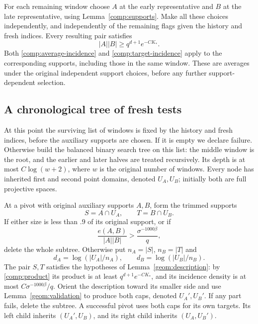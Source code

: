 For each remaining window choose \(A\) at the early
representative and \(B\) at the late representative, using
Lemma~\ref{comp:supports}.
Make all these choices independently, and independently of
the remaining flags given the history and fresh indices.
Every resulting pair satisfies
\begin{equation}\label{comp:product}
 |A||B|\ge q^{d+1}e^{-CK_*}.
\end{equation}
Both \eqref{comp:average-incidence} and
\eqref{comp:target-incidence} apply to the corresponding
supports, including those in the same window.
These are averages under the original independent support
choices, before any further support-dependent selection.

\subsection{A chronological tree of fresh tests}

At this point the surviving list of windows is fixed by the
history and fresh indices, before the auxiliary supports are
chosen. If it is empty we declare failure.
Otherwise build the balanced binary search tree on this list:
the middle window is the root, and the earlier and later
halves are treated recursively. Its depth is at most
\(C\log(w+2)\), where \(w\) is the original number of windows.
Every node has inherited first and second point domains,
denoted \(U_A,U_B\); initially both are full projective spaces.

At a pivot with original auxiliary supports \(A,B\), form the
trimmed supports
\[
 S=A\cap U_A,\qquad T=B\cap U_B.
\]
If either size is less than \(.9\) of its original support,
or if
\[
 \frac{e(A,B)}{|A||B|}
       >\frac{\sigma^{-1000\beta}}q,
\]
delete the whole subtree. Otherwise put
\(n_A=|S|\), \(n_B=|T|\) and
\[
 d_A=\log(|U_A|/n_A),\qquad
 d_B=\log(|U_B|/n_B).
\]
The pair \(S,T\) satisfies the hypotheses of
Lemma~\ref{geom:description}: by \eqref{comp:product} its
product is at least \(q^{d+1}e^{-CK_*}\), and its incidence
density is at most \(C\sigma^{-1000\beta}/q\).
Orient the description toward its smaller side and use
Lemma~\ref{geom:validation} to produce both caps, denoted
\(U_A',U_B'\). If any part fails, delete the subtree.
A successful pivot uses both caps for its own targets.
Its left child inherits \((U_A',U_B)\), and its right child
inherits \((U_A,U_B')\).

